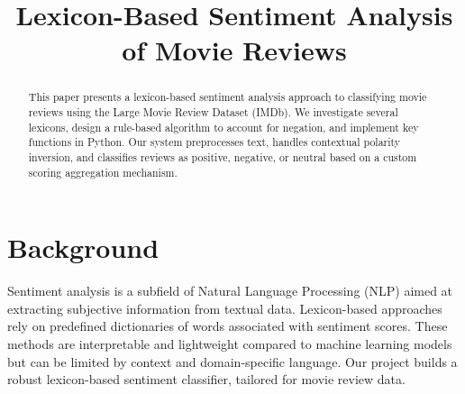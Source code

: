 \documentclass[conference]{IEEEtran}
\begin{document}
	
	\title{Lexicon-Based Sentiment Analysis of Movie Reviews}
	
	\author{
		\and
		\and
	}
	
	\maketitle
	
	\begin{abstract}
		This paper presents a lexicon-based sentiment analysis approach to classifying movie reviews using the Large Movie Review Dataset (IMDb). We investigate several lexicons, design a rule-based algorithm to account for negation, and implement key functions in Python. Our system preprocesses text, handles contextual polarity inversion, and classifies reviews as positive, negative, or neutral based on a custom scoring aggregation mechanism.
	\end{abstract}
	
	\section{Background}
	Sentiment analysis is a subfield of Natural Language Processing (NLP) aimed at extracting subjective information from textual data. Lexicon-based approaches rely on predefined dictionaries of words associated with sentiment scores. These methods are interpretable and lightweight compared to machine learning models but can be limited by context and domain-specific language. Our project builds a robust lexicon-based sentiment classifier, tailored for movie review data.
	
\end{document}
